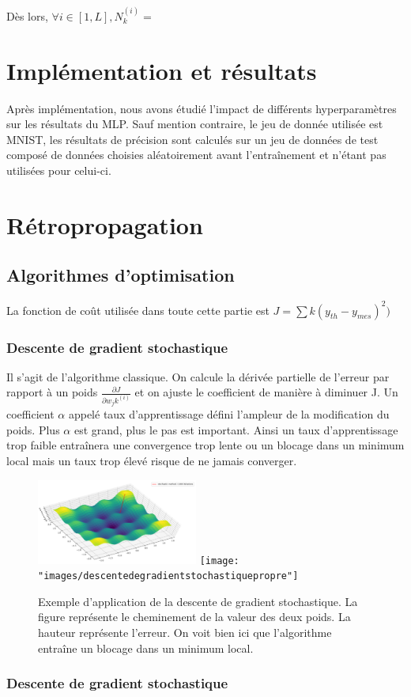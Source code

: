 Dès lors, $\forall i \in [1,L], N^{(i)}_k =  $



\section{Implémentation et résultats}
Après implémentation, nous avons étudié l'impact de différents hyperparamètres sur les résultats du MLP. Sauf mention contraire, le jeu de donnée utilisée est MNIST, les résultats de précision sont calculés sur un jeu de données de test composé de données choisies aléatoirement avant l’entraînement et n'étant pas utilisées pour celui-ci.

\section{Rétropropagation}


\subsection{Algorithmes d'optimisation}
La fonction de coût utilisée dans toute cette partie est $J = \sum \limits{k}{} (y_{th} - y_{mes})^2)$


\subsubsection{Descente de gradient stochastique}
Il s'agit de l'algorithme classique. On calcule la dérivée partielle de l'erreur par rapport à un poids $\frac{\partial J}{\partial w_jk^{(i)}}$ et on ajuste le coefficient de manière à diminuer J. Un coefficient $\alpha$ appelé taux d'apprentissage défini l'ampleur de la modification du poids. Plus $\alpha$ est grand, plus le pas est important. Ainsi un taux d'apprentissage trop faible entraînera une convergence trop lente ou un blocage dans un minimum local mais un taux trop élevé risque de ne jamais converger. 

\begin{figure}[!h]
\centering
\includegraphics[width=150pt,valign=t]{"images/MLP/descentedegradientstochastique"}
\hspace*{10mm}
\texttt{[image: "images/descentedegradientstochastiquepropre"]}
\caption{Exemple d'application de la descente de gradient stochastique. La figure représente le cheminement de la valeur des deux poids. La hauteur représente l'erreur. On voit bien ici que l'algorithme entraîne un blocage dans un minimum local.}
\label{descentedegradientstochastique}
\end{figure}



\subsubsection{Descente de gradient stochastique}
	

















